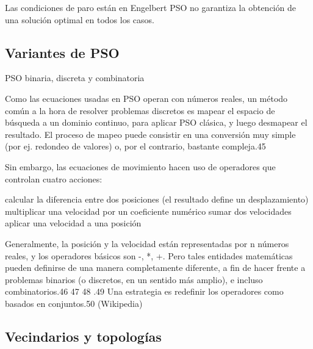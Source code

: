 \documentclass{article}
\begin{document}
Las condiciones de paro están en Engelbert
PSO no garantiza la obtención de una solución optimal en todos los casos.
\subsection{Variantes de PSO}
PSO binaria, discreta y combinatoria

Como las ecuaciones usadas en PSO operan con números reales, un método común a la hora de resolver problemas discretos es mapear el espacio de búsqueda a un dominio continuo, para aplicar PSO clásica, y luego desmapear el resultado. El proceso de mapeo puede consistir en una conversión muy simple (por ej. redondeo de valores) o, por el contrario, bastante compleja.45

Sin embargo, las ecuaciones de movimiento hacen uso de operadores que controlan cuatro acciones:

    calcular la diferencia entre dos posiciones (el resultado define un desplazamiento)
    multiplicar una velocidad por un coeficiente numérico
    sumar dos velocidades
    aplicar una velocidad a una posición

Generalmente, la posición y la velocidad están representadas por n números reales, y los operadores básicos son -, *, +. Pero tales entidades matemáticas pueden definirse de una manera completamente diferente, a fin de hacer frente a problemas binarios (o discretos, en un sentido más amplio), e incluso combinatorios.46 47 48 .49 Una estrategia es redefinir los operadores como basados en conjuntos.50
(Wikipedia)
\blindtext[3]
\subsection{Vecindarios y topologías}
\blindtext[3]


\nocite{*}

 
\end{document}

